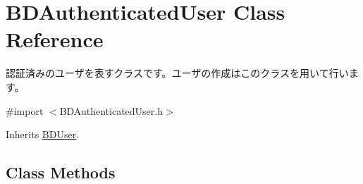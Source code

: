 \hypertarget{interface_b_d_authenticated_user}{\section{B\-D\-Authenticated\-User Class Reference}
\label{interface_b_d_authenticated_user}
}


認証済みのユーザを表すクラスです。ユーザの作成はこのクラスを用いて行います。  




{\ttfamily \#import $<$B\-D\-Authenticated\-User.\-h$>$}



Inherits \hyperlink{interface_b_d_user}{B\-D\-User}.

\subsection*{Class Methods}
